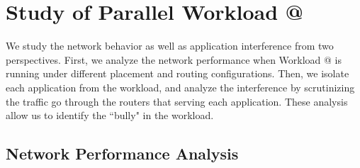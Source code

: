 \documentclass[conference,compsoc]{IEEEtran}
\makeatletter
\newcommand{\NOTE}[1]{\hl {NOTE: #1}}
\newcommand{\Rmnum}[1]{\expandafter\@slowromancap\romannumeral #1@}
\makeatother
\begin{document}
\section{Study of Parallel Workload \Rmnum{1 }}
\label{sec:workload-1}

We study the network behavior as well as application interference from two perspectives. First, we analyze the network performance when Workload \Rmnum{1 } is running under different placement and routing configurations. Then, we isolate each application from the workload, and analyze the interference by scrutinizing the traffic go through the routers that serving each application. These analysis allow us to identify the ``bully" in the workload.


% 



\subsection{Network Performance Analysis}
\label{sec: workload-1 network analysis}
%  
\end{document}
